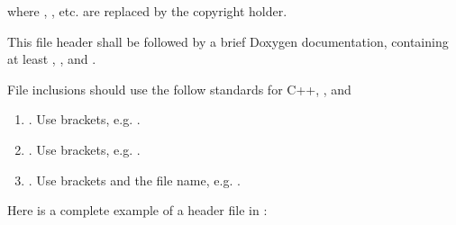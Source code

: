 \documentclass[letterpaper,10pt,english]{sphinxmanual}
\begin{document}
where , , etc. are replaced by the copyright holder.

This file header shall be followed by a brief Doxygen documentation, containing at least , , and .

File inclusions should use the follow standards for C++, , and 
\begin{enumerate}
%
\item {} 
. Use brackets, e.g. .

\item {} 
. Use brackets, e.g. .

\item {} 
. Use brackets and the file name, e.g. .

\end{enumerate}

Here is a complete example of a header file in :
\end{document}

